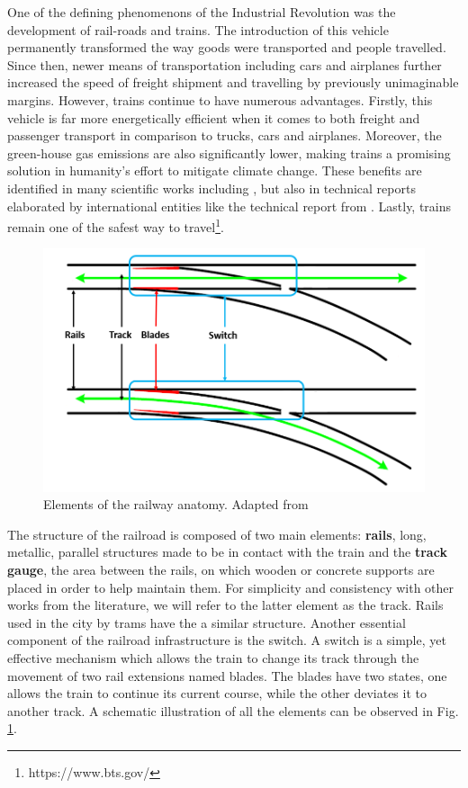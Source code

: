 \documentclass[conference]{IEEEtran}
\begin{document}
One of the defining phenomenons of the Industrial Revolution was the development of rail-roads and trains. The introduction of this vehicle permanently transformed the way goods
were transported and people travelled. Since then, newer means of transportation including cars and airplanes further increased the speed of freight shipment and travelling by previously unimaginable margins. However, trains continue to have numerous advantages. Firstly, this vehicle is far more energetically efficient when it comes to both freight and passenger transport in comparison to trucks, cars and airplanes.
Moreover, the green-house gas emissions are also significantly lower, making trains a promising solution in humanity's effort to mitigate climate change. These benefits are identified in many scientific works including \cite{dalkic2017assessment}, but also in technical reports elaborated by international entities like the technical report from \cite{IEA2019}. Lastly, trains remain one of the safest way to travel\footnote{https://www.bts.gov/}. 

\begin{figure}[htb]
    \centering
	\centerline{\includegraphics[scale=0.4]{figures/rail_anatomy.png}}
	\caption{Elements of the railway anatomy. Adapted from \cite{karakose2016detection}}
	\label{fig:railanatomy}
\end{figure}

The structure of the railroad is composed of two main elements: \textbf{rails}, long, metallic, parallel structures made to be in contact with the train and the \textbf{track gauge}, the area between the rails, on which wooden or concrete supports are placed in order to help maintain them. For simplicity and consistency with other works from the literature, we will refer to the latter element as the track. Rails used in the city by trams have the a similar structure. Another essential component of the railroad infrastructure is the switch. A switch is a simple, yet effective mechanism which allows the train to change its track through the movement of two rail extensions named blades. The blades have two states, one allows the train to continue its current course, while the other deviates it to another track. A schematic illustration of all the elements can be observed in Fig. \ref{fig:railanatomy}.
\end{document}
